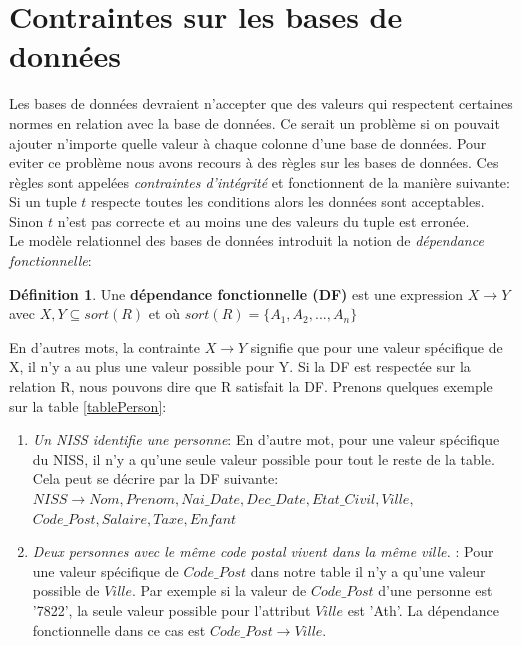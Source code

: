 \documentclass[letterpaper, 12pt]{report}
\theoremstyle{definition}
\newtheorem{mydef}{Définition}
\newcommand{\alinea}{
\hspace*{0.5cm}}
\begin{document}
\newpage

\section{Contraintes sur les bases de données}

\alinea Les bases de données devraient n'accepter que des valeurs qui respectent certaines normes en relation avec la base de données. Ce serait un problème si on pouvait ajouter n'importe quelle valeur à chaque colonne d'une base de données. Pour eviter ce problème nous avons recours à des règles sur les bases de données. Ces règles sont appelées \emph{contraintes d'intégrité} et fonctionnent de la manière suivante: Si un tuple $t$ respecte toutes les conditions alors les données sont acceptables. Sinon $t$ n'est pas correcte et au moins une des valeurs du tuple est erronée.\\

Le modèle relationnel des bases de données introduit la notion de \emph{dépendance fonctionnelle}:

\begin{mydef}
Une \textbf{dépendance fonctionnelle (DF)} est une expression $X \rightarrow Y$ avec $X,Y \subseteq
sort(R)$ et où $sort(R) = \{ A_1,A_2,...,A_n\}$
\end{mydef} 

En d'autres mots, la contrainte $X \rightarrow Y$ signifie que pour une valeur spécifique de X, il n'y a au plus une valeur possible pour Y. Si la DF est respectée sur la relation R, nous pouvons dire que R satisfait la DF. Prenons quelques exemple sur la table \ref{tablePerson}:

\begin{enumerate}
\item \emph{Un NISS identifie une personne}: En d'autre mot, pour une valeur spécifique du NISS, il n'y a qu'une seule valeur possible pour tout le reste de la table. Cela peut se décrire par la DF suivante:
$ NISS \rightarrow Nom, Prenom, Nai\_Date, Dec\_Date, Etat\_Civil, Ville,$ $Code\_Post, Salaire, Taxe, Enfant$
\item \emph{Deux personnes avec le même code postal vivent dans la même ville.} : Pour une valeur spécifique de $Code\_Post$ dans notre table il n'y a qu'une valeur possible de $Ville$. Par exemple si la valeur de $Code\_Post$ d'une personne est '7822', la seule valeur possible pour l'attribut $Ville$ est 'Ath'. La dépendance fonctionnelle dans ce cas est $Code\_Post \rightarrow Ville$.
\end{enumerate}
\end{document}
